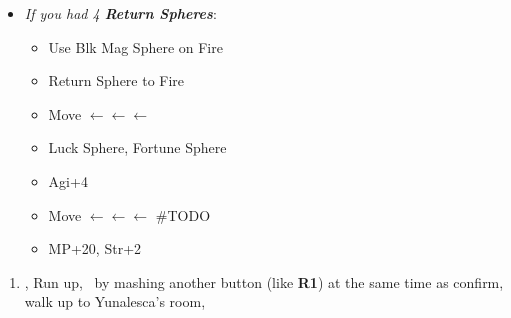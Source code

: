 \begin{spheregrid}
    \begin{itemize}
        \item \textit{If you had 4 \textbf{Return Spheres}}:
            \begin{itemize}
                \item Use Blk Mag Sphere on Fire
                \item Return Sphere to Fire
                \item Move $\leftarrow\leftarrow\leftarrow$
                \item Luck Sphere, Fortune Sphere
                \item Agi+4
                \item Move $\leftarrow\leftarrow\leftarrow$ \#TODO
                \item MP+20, Str+2
            \end{itemize}
    \end{itemize}
\end{spheregrid}
\begin{enumerate}[resume]
    \item \save, Run up, \sd\ by mashing another button (like \textbf{R1}) at the same time as confirm, walk up to Yunalesca's room, \sd
\end{enumerate}
